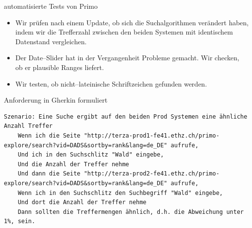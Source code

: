 \begin{frame}[<+->]{automatisierte Tests von Primo}
  \begin{itemize}
    \item Wir prüfen nach einem Update, ob sich die Suchalgorithmen verändert haben, indem wir die Trefferzahl zwischen den beiden Systemen mit identischem Datenstand vergleichen.
    \item Der Date--Slider hat in der Vergangenheit Probleme gemacht. Wir checken, ob er plausible Ranges liefert.
    \item Wir testen, ob nicht--lateinische Schriftzeichen gefunden werden.
  \end{itemize}
\end{frame}


\begin{frame}[fragile]{Anforderung in Gherkin formuliert}
  \selectfont
  \begin{lstlisting}
Szenario: Eine Suche ergibt auf den beiden Prod Systemen eine ähnliche Anzahl Treffer
    Wenn ich die Seite "http://terza-prod1-fe41.ethz.ch/primo-explore/search?vid=DADS&sortby=rank&lang=de_DE" aufrufe,
    Und ich in den Suchschlitz "Wald" eingebe,
    Und die Anzahl der Treffer nehme
    Und dann die Seite "http://terza-prod2-fe41.ethz.ch/primo-explore/search?vid=DADS&sortby=rank&lang=de_DE" aufrufe,
    Wenn ich in den Suchschlitz den Suchbegriff "Wald" eingebe,
    Und dort die Anzahl der Treffer nehme
    Dann sollten die Treffermengen ähnlich, d.h. die Abweichung unter 1%, sein.
  \end{lstlisting}
\end{frame}


